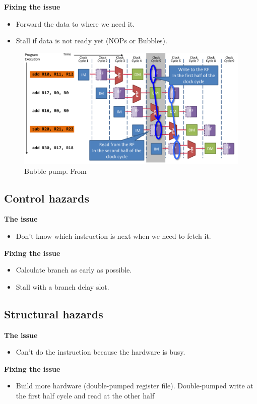 \noindent\textbf{Fixing the issue}
\begin{itemize}
\item  Forward the data to where we need it.
\item  Stall if data is not ready yet (NOPs or Bubbles).
\end{itemize}

\begin{figure}[H]
    \centering
    \includegraphics[width=16cm]{image/dubble-pump.png} 
    \caption{Bubble pump. From \cite{ca}}
\end{figure}


\subsection{Control hazards}
\textbf{The issue}
\begin{itemize}
\item  Don’t know which instruction is next when we need to fetch it.
\end{itemize}

\noindent\textbf{Fixing the issue}
\begin{itemize}
\item  Calculate branch as early as possible.
\item  Stall with a branch delay slot.
\end{itemize}


\subsection{Structural hazards}
\textbf{The issue}
\begin{itemize}
\item  Can’t do the instruction because the hardware is busy.  
\end{itemize}

\noindent\textbf{Fixing the issue}
\begin{itemize}
\item  Build more hardware (double-pumped register file).
  Double-pumped write at the first half cycle and read at the other half
\end{itemize}

